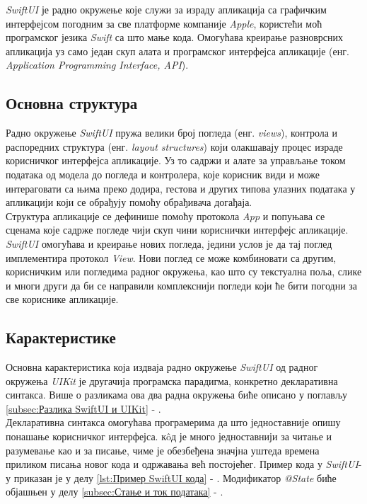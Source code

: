 \documentclass[12pt,oneside]{memoir}
\begin{document}
\indent \textit{SwiftUI} је радно окружење које служи за израду апликација са графичким интерфејсом погодним за све платформе компаније \textit{Apple}, користећи моћ програмског језика \textit{Swift} са што мање кода. Омогућава креирање разноврсних апликација уз само један скуп алата и програмског интерфејса апликације (енг. \textit{Application Programming Interface, API}). 

\subsection{Основна структура}

\indent Радно окружење \textit{SwiftUI} пружа велики број погледа (енг. \textit{views}), контрола и распоредних структура (енг. \textit{layout structures}) који олакшавају процес израде корисничког интерфејса апликације. Уз то садржи и алате за управљање током података од модела до погледа и контролера, које корисник види и може интераговати са њима преко додира, гестова и других типова улазних података у апликацији који се обрађују помоћу обрађивача догађаја. 
\\
\indent Структура апликације се дефинише помоћу протокола \textit{App} и попуњава се сценама које садрже погледе чији скуп чини кориснички интерфејс апликације. \textit{SwiftUI} омогућава и креирање нових погледа, једини услов је да тај поглед имплементира протокол \textit{View}. Нови поглед се може комбиновати са другим, корисничким или погледима радног окружења, као што су текстуална поља, слике и многи други да би се направили комплекснији погледи који ће бити погодни за све кориснике апликације.

\subsection{Карактеристике}

\indent Основна карактеристика која издваја радно окружење \textit{SwiftUI} од радног окружења \textit{UIKit} је другачија програмска парадигма, конкретно декларативна синтакса. Више о разликама ова два радна окружења биће описано у поглављу \ref{subsec:Разлика SwiftUI и UIKit} - . 
\\
\indent Декларативна синтакса омогућава програмерима да што једноставније опишу понашање корисничког интерфејса. к\^{o}д је много једноставнији за читање и разумевање као и за писање, чиме је обезбеђена значјна уштеда времена приликом писања новог кода и одржавања већ постојећег. Пример кода у \textit{SwiftUI}-у приказан је у делу \ref{lst:Пример SwiftUI кода} - . Модификатор \textit{@State} биће објашњен у делу \ref{subsec:Стање и ток података} - .
\end{document}
